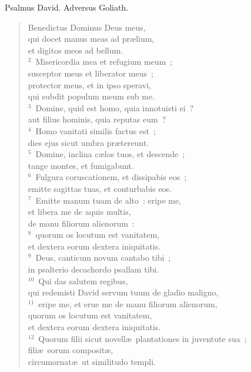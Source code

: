 \bchapter
\lettrine[lines=3,image=true,loversize=0.05,lraise=-0.03]{P}{}salmus David. Adversus Goliath. \begin{flushleft}\begin{verse}\vspace{6pt}Benedictus Dominus Deus meus,\\ qui docet manus meas ad pr\ae lium,\\ et digitos meos ad bellum.\\
${}^{2}$~Misericordia mea et refugium meum~;\\ susceptor meus et liberator meus~;\\ protector meus, et in ipso speravi,\\ qui subdit populum meum sub me.\\
${}^{3}$~Domine, quid est homo, quia innotuisti ei~?\\ aut filius hominis, quia reputas eum~?\\
${}^{4}$~Homo vanitati similis factus est~;\\ dies ejus sicut umbra pr\ae tereunt.\\
${}^{5}$~Domine, inclina c\ae los tuos, et descende~;\\ tange montes, et fumigabunt.\\
${}^{6}$~Fulgura coruscationem, et dissipabis eos~;\\ emitte sagittas tuas, et conturbabis eos.\\
${}^{7}$~Emitte manum tuam de alto~: eripe me,\\ et libera me de aquis multis,\\ de manu filiorum alienorum~:\\
${}^{8}$~quorum os locutum est vanitatem,\\ et dextera eorum dextera iniquitatis.\\
${}^{9}$~Deus, canticum novum cantabo tibi~;\\ in psalterio decachordo psallam tibi.\\
${}^{10}$~Qui das salutem regibus,\\ qui redemisti David servum tuum de gladio maligno,\\
${}^{11}$~eripe me, et erue me de manu filiorum alienorum,\\ quorum os locutum est vanitatem,\\ et dextera eorum dextera iniquitatis.\\
${}^{12}$~Quorum filii sicut novell\ae\ plantationes in juventute sua~;\\ fili\ae\ eorum composit\ae ,\\ circumornat\ae\ ut similitudo templi.\\

\end{verse}
\end{flushleft}
